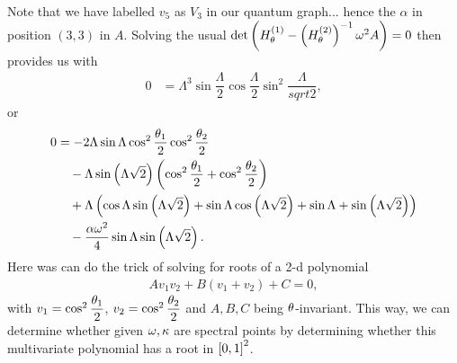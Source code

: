 Note that we have labelled $v_5$ as $V_3$ in our quantum graph... hence the $\alpha$ in position $(3,3)$ in $A$.
Solving the usual $\det\left( H_{\theta}^{(1)} - \left(  H_{\theta}^{(2)}  \right)^{-1}\omega^2 A \right)=0$ then provides us with
\begin{align*}
	0 &= \Lambda^3\sin\dfrac{\Lambda}{2}\cos\dfrac{\Lambda}{2}\sin^2\dfrac{\Lambda}{sqrt{2}},
\end{align*}
or
\begin{align*}
	0 &= -2\Lambda\sin\Lambda\cos^2\dfrac{\theta_1}{2}\cos^2\dfrac{\theta_2}{2} \\
	&\quad -\Lambda\sin\left( \Lambda\sqrt{2} \right)\left( \cos^2\dfrac{\theta_1}{2} + \cos^2\dfrac{\theta_2}{2} \right) \\
	&\quad + \Lambda\left(  \cos\Lambda\sin\left( \Lambda\sqrt{2} \right) + \sin\Lambda\cos\left( \Lambda\sqrt{2} \right) + \sin\Lambda + \sin\left( \Lambda\sqrt{2} \right)  \right) \\
	&\quad - \frac{\alpha\omega^2}{4}\sin\Lambda\sin\left( \Lambda\sqrt{2} \right).
\end{align*}
Here was can do the trick of solving for roots of a 2-d polynomial
\begin{align*}
	A v_1 v_2 + B (v_1 + v_2) + C = 0,
\end{align*}
with $v_1 = \cos^2\dfrac{\theta_1}{2}$, $v_2 = \cos^2\dfrac{\theta_2}{2}$ and $A,B,C$ being $\theta$-invariant.
This way, we can determine whether given $\omega, \kappa$ are spectral points by determining whether this multivariate polynomial has a root in $\left[ 0,1 \right]^2$.

